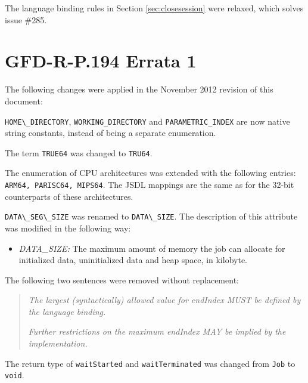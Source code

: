 \documentclass{article}
\newcommand{\h}[1]{\lstinline|#1|}
\begin{document}
The language binding rules in Section \ref{sec:closesession} were relaxed, which solves issue \#285.

\section{GFD-R-P.194 Errata 1}
\label{sec:errata1}

The following changes were applied in the November 2012 revision of this document:

\h{HOME\_DIRECTORY}, \h{WORKING_DIRECTORY} and \h{PARAMETRIC_INDEX} are now native string constants, instead of being a separate enumeration.

The term \h{TRUE64} was changed to \h{TRU64}.

The enumeration of CPU architectures was extended with the following entries: \h{ARM64, PARISC64, MIPS64}. The JSDL mappings are the same as for the 32-bit counterparts of these architectures.

\h{DATA\_SEG\_SIZE} was renamed to \h{DATA\_SIZE}. The description of this attribute was modified in the following way:

\begin{itemize}
\item \emph{DATA\_SIZE:} The maximum amount of memory the job can allocate for initialized data, uninitialized data and heap space, in kilobyte.
\end{itemize}

The following two sentences were removed without replacement:

\begin{quote}
\emph{The largest (syntactically) allowed value for endIndex MUST be defined by the language binding.}

\emph{Further restrictions on the maximum endIndex MAY be implied by the implementation.}
\end{quote}

The return type of \h{waitStarted} and \h{waitTerminated} was changed from \h{Job} to \h{void}.
\end{document}
